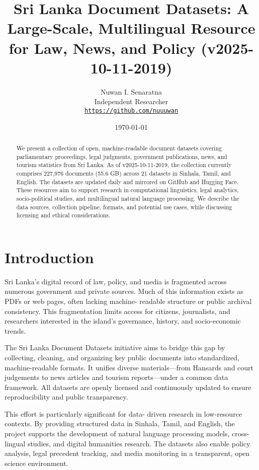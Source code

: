 \documentclass[10pt,a4paper]{article}%
\title{Sri Lanka Document Datasets: A Large{-}Scale, Multilingual Resource for Law, News, and Policy (v2025{-}10{-}11{-}2019)}%
\author{Nuwan I. Senaratna\\Independent Researcher\\\vspace{0.25em}\texttt{\href{https://github.com/nuuuwan}{https://github.com/nuuuwan}}}%
\date{\today}%
\begin{document}
%
\normalsize%
\maketitle%
\begin{abstract}%
We present a collection of open, machine-readable document datasets covering parliamentary proceedings, legal judgments, government publications, news, and tourism statistics from Sri Lanka. As of v2025-10-11-2019,  the collection currently comprises 227,976  documents (55.6 GB) across 21  datasets in Sinhala, Tamil, and English. The datasets are updated daily and mirrored on GitHub and Hugging Face. These resources aim to support research in computational linguistics, legal analytics, socio-political studies, and multilingual natural language processing. We describe the data sources, collection pipeline, formats, and potential use cases, while discussing licensing and ethical considerations.%

%
\end{abstract}%
\section{Introduction}%
\label{sec:Introduction}%
Sri Lanka’s digital record of law, policy, and media is fragmented across numerous government and private sources. Much of this information exists as PDFs or web pages, often lacking machine- readable structure or public archival consistency. This fragmentation limits access for citizens, journalists, and researchers interested in the island’s governance, history, and socio-economic trends.%

%
The Sri Lanka Document Datasets initiative aims to bridge this gap by collecting, cleaning, and organizing key public documents into standardized, machine-readable formats. It unifies diverse materials—from Hansards and court judgements to news articles and tourism reports—under a common data framework. All datasets are openly licensed and continuously updated to ensure reproducibility and public transparency.%

%
This effort is particularly significant for data- driven research in low-resource contexts. By providing structured data in Sinhala, Tamil, and English, the project supports the development of natural language processing models, cross-lingual studies, and digital humanities research. The datasets also enable policy analysis, legal precedent tracking, and media monitoring in a transparent, open science environment.%
\end{document}
